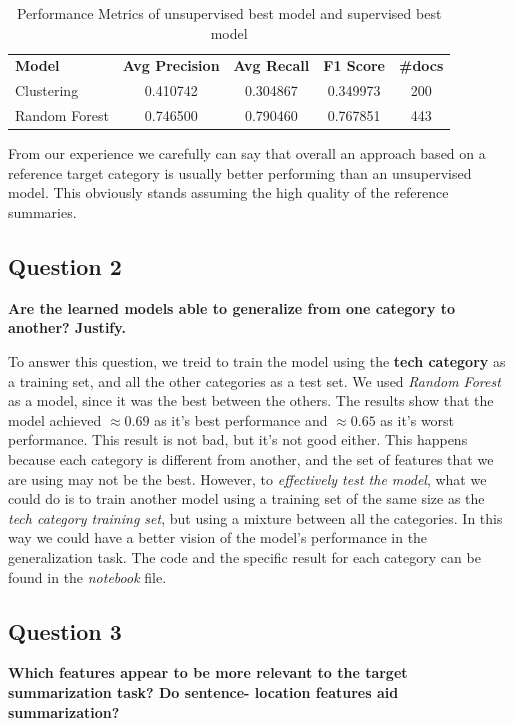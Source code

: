 \begin{table}[H]
\centering
\begin{tabular}{lcccc}
\textbf{Model} & \textbf{Avg Precision} & \textbf{Avg Recall} & \textbf{F1 Score} & \textbf{\#docs} \\
Clustering & 0.410742 & 0.304867 & 0.349973 & 200 \\
Random Forest & 0.746500 & 0.790460 & 0.767851 & 443 \\
\end{tabular}
\caption{Performance Metrics of unsupervised best model  and supervised best model}
\label{tab:performance}
\end{table}

From our experience we carefully can say that overall an approach based on a reference target category is usually better performing than an unsupervised model. This obviously stands assuming the high quality of the reference summaries. 

\subsection{Question 2}
\textbf{ Are the learned models able to generalize from one category to another? Justify.}

To answer this question, we treid to train the model using the \textbf{tech category} as a training set, and 
all the other categories as a test set. We used \textit{Random Forest} as a model, since it was the best between the others.
The results show that the model achieved $\approx 0.69$ as it's best performance and $\approx 0.65$ as it's worst performance. 
This result is not bad, but it's not good either. This happens because each category is different from another, and the set of features 
that we are using may not be the best. However, to \textit{effectively test the model}, what we could do is to train another model 
using a training set of the same size as the \textit{tech category training set}, but using a mixture between all the categories.
In this way we could have a better vision of the model's performance in the generalization task. 
The code and the specific result for each category can be found in the \textit{notebook} file.


\subsection{Question 3}
\textbf{Which features appear to be more relevant to the target summarization task? Do sentence- location features aid summarization?}

